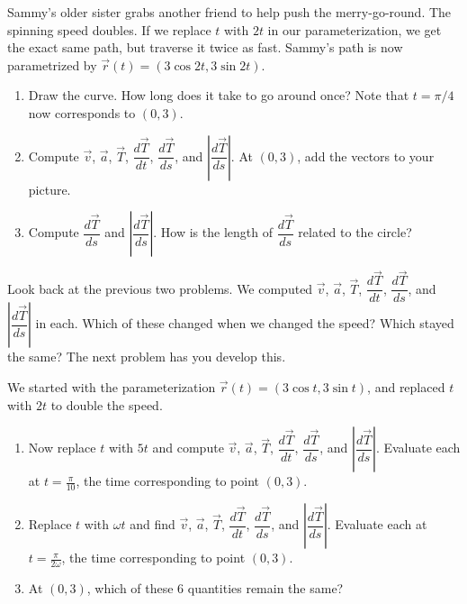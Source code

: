 \begin{problem}
 Sammy's older sister grabs another friend to help push the merry-go-round. The spinning speed doubles. If we replace $t$ with $2t$ in our parameterization, we get the exact same path, but traverse it twice as fast.  Sammy's path is now parametrized by $\vec r(t) = (3\cos 2t, 3\sin 2t)$.
\begin{enumerate}
 \item Draw the curve. How long does it take to go around once?  Note that $t=\pi/4$ now corresponds to $(0,3)$. 
 \item Compute $\vec v$, $\vec a$, $\vec T$, $\dfrac{d\vec T}{dt}$, $\dfrac{d\vec T}{ds}$, and $\left|\dfrac{d\vec T}{ds}\right|$. At $(0,3)$, add the vectors to your picture.
 \item Compute $\dfrac{d\vec T}{ds}$ and $\left|\dfrac{d\vec T}{ds}\right|$. How is the length of $\dfrac{d\vec T}{ds}$ related to the circle?  
\end{enumerate}
\end{problem}

Look back at the previous two problems.  We computed $\vec v$, $\vec a$, $\vec T$, $\dfrac{d\vec T}{dt}$, $\dfrac{d\vec T}{ds}$, and $\left|\dfrac{d\vec T}{ds}\right|$ in each. Which of these changed when we changed the speed?  Which stayed the same? The next problem has you develop this. 

\begin{problem}
We started with the parameterization $\vec r(t) = (3\cos t, 3\sin t)$, and replaced $t$ with $2t$ to double the speed. 
\begin{enumerate}
 \item Now replace $t$ with $5t$ and compute $\vec v$, $\vec a$, $\vec T$, $\dfrac{d\vec T}{dt}$, $\dfrac{d\vec T}{ds}$, and $\left|\dfrac{d\vec T}{ds}\right|$. Evaluate each at $t=\frac{\pi}{10}$, the time corresponding to point $(0,3)$.
 \item Replace $t$ with $\omega t$ and find $\vec v$, $\vec a$, $\vec T$, $\dfrac{d\vec T}{dt}$, $\dfrac{d\vec T}{ds}$, and $\left|\dfrac{d\vec T}{ds}\right|$. Evaluate each at $t=\frac{\pi}{2\omega}$, the time corresponding to point $(0,3)$.
 \item At $(0,3)$, which of these 6 quantities remain the same?
\end{enumerate}
\end{problem}

